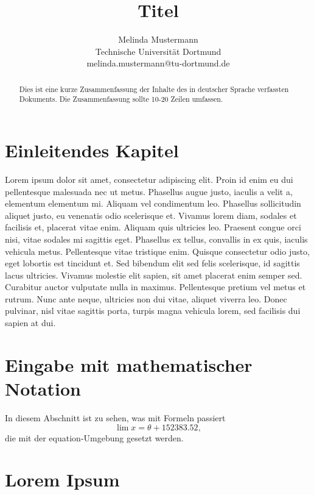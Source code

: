 \documentclass[twoside,11pt,abbrvbib]{article}
\begin{document}
\title{Titel}

\author{\name Melinda Mustermann\\
    \addr Technische Universität Dortmund\\
    \email melinda.mustermann@tu-dortmund.de \\
}


\maketitle

\begin{abstract}%
Dies ist eine kurze Zusammenfassung der Inhalte des in deutscher Sprache
verfassten Dokuments. Die Zusammenfassung sollte 10-20 Zeilen umfassen.
\end{abstract}


\section{Einleitendes Kapitel}
Lorem ipsum dolor sit amet, consectetur adipiscing elit. Proin id enim eu dui pellentesque malesuada nec ut metus. Phasellus augue justo, iaculis a velit a, elementum elementum mi. Aliquam vel condimentum leo. Phasellus sollicitudin aliquet justo, eu venenatis odio scelerisque et. Vivamus lorem diam, sodales et facilisis et, placerat vitae enim. Aliquam quis ultricies leo. Praesent congue orci nisi, vitae sodales mi sagittis eget. Phasellus ex tellus, convallis in ex quis, iaculis vehicula metus. Pellentesque vitae tristique enim. Quisque consectetur odio justo, eget lobortis est tincidunt et. Sed bibendum elit sed felis scelerisque, id sagittis lacus ultricies. Vivamus molestie elit sapien, sit amet placerat enim semper sed. Curabitur auctor vulputate nulla in maximus. Pellentesque pretium vel metus et rutrum. Nunc ante neque, ultricies non dui vitae, aliquet viverra leo. Donec pulvinar, nisl vitae sagittis porta, turpis magna vehicula lorem, sed facilisis dui sapien at dui.
\section{Eingabe mit mathematischer Notation}
In diesem Abschnitt ist zu sehen, was mit Formeln \cite{chow:68} passiert
\begin{equation}
\lim x =  \theta + 152383.52,
\end{equation}
die mit der equation-Umgebung gesetzt werden.
\section{Lorem Ipsum}
\end{document}
